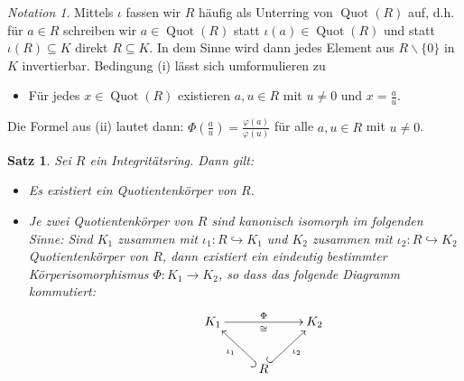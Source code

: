 \documentclass[a4paper, twoside, 11pt, ngerman]{report}
\renewcommand{\setminus}{\smallsetminus}
\DeclareMathOperator{\Quot}{Quot}
\theoremstyle{definistyle}
\newtheorem{satz}{Satz}[section]
\theoremstyle{remark}
\newtheorem*{notation}{Notation}
\begin{document}
\begin{notation}
Mittels $\iota$ fassen wir $R$ häufig als Unterring von $\Quot(R)$ auf, d.h. für $a \in R$ schreiben wir $a \in \Quot(R)$ statt $\iota(a) \in \Quot(R)$ und statt $\iota(R) \subseteq K$ direkt $R \subseteq K$.
In dem Sinne wird dann jedes Element aus $R \setminus \{0\}$ in $K$ invertierbar.
Bedingung (i) lässt sich umformulieren zu
\begin{itemize}
    \item[(i')] Für jedes $x \in \Quot(R)$ existieren $a, u \in R$ mit $u \neq 0$ und $x = \frac{a}{u}$.
\end{itemize}
Die Formel aus (ii) lautet dann: $\Phi \left( \frac{a}{u} \right) = \frac{\varphi(a)}{\varphi(u)}$
für alle $a, u \in R$ mit $u \neq 0$.
\end{notation}

\begin{satz}\label{satz:existenz_quotientenkörper}
Sei $R$ ein Integritätsring. Dann gilt:
\begin{itemize}
    \item[(a)] Es existiert ein Quotientenkörper von $R$.
    \item[(b)] Je zwei Quotientenkörper von $R$ sind kanonisch isomorph im folgenden Sinne: Sind $K_1$ zusammen mit $\iota_1 \colon R \hookrightarrow K_1$ und $K_2$ zusammen mit $\iota_2 \colon R \hookrightarrow K_2$ Quotientenkörper von $R$, dann existiert ein eindeutig bestimmter Körperisomorphismus $\Phi \colon K_1 \to K_2$, so dass das folgende Diagramm kommutiert:
    \[
    \begin{xy}
    \xymatrix{
        & K_1 \ar[rr]^{\Phi}_\cong & & K_2 \\
        & & R \ar@{^{(}->}[ul]^{\iota_1} \ar@{^{(}->}[ur]_{\iota_2} &
    }
    \end{xy}
    \]
\end{itemize}
\end{satz}
\end{document}
